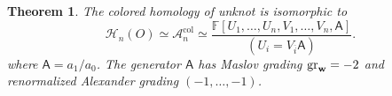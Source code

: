 \documentclass{amsart}
\newtheorem{theorem}{Theorem}[section]
\newtheorem{corollary}[theorem]{Corollary}
\newcommand{\CA}{\mathcal{A}}
\newcommand{\col}{\mathrm{col}}
\newcommand{\cHFL}{\mathcal{H\!F\! L}}
\newcommand{\HFL}{\mathit{HFL}}
\newcommand{\HD}{\mathcal{H}}
\newcommand{\w}{\mathbf{w}}
\def\gr{\textup{gr}}
\def\w{{\bf{w}}}
\newcommand{\UU}{\mathbf{U}}
\newcommand{\A}{\mathfrak{A}}
\renewcommand{\AA}[1]{{\color{blue}#1}}
\newcommand{\EG}[1]{{\color{red}#1}}
\newcommand{\AAA}{\mathsf{A}}
\begin{document}





 




\begin{theorem}
\label{thm: colored unknot}
The   colored homology of unknot is isomorphic to 
\begin{equation}
\label{eq: localized algebra}
\HD_n(O)\simeq \CA_n^{\col}\simeq 
\frac{\mathbb{F}[U_1,\ldots,U_n,V_1,\ldots,V_n,\AAA]}{(U_i=V_{\overline{i}}\AAA)}.
\end{equation}
where $\AAA=a_1/a_0$. The generator $\AAA$ has Maslov grading $\gr_{\w}=-2$ and renormalized Alexander grading $(-1,\ldots,-1)$.
\end{theorem}
\end{document}
